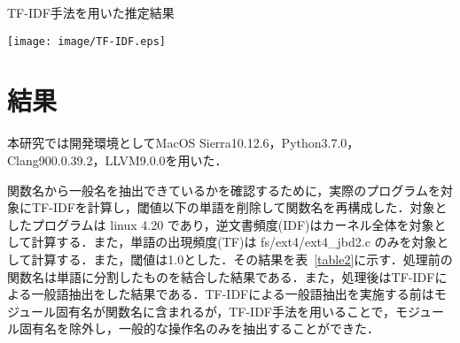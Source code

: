 \documentclass[submit,techrep,noauthor]{ipsj}
\begin{document}







\begin{table}[t]
 \centering
 \caption{TF-IDF手法を用いた推定結果}
 \texttt{[image: image/TF-IDF.eps]} 
 \label{table2} 
\end{table}


\section{結果}
本研究では開発環境としてMacOS Sierra10.12.6，Python3.7.0，Clang900.0.39.2，LLVM9.0.0を用いた．

関数名から一般名を抽出できているかを確認するために，実際のプログラムを対象にTF-IDFを計算し，閾値以下の単語を削除して関数名を再構成した．対象としたプログラムは linux 4.20 であり，逆文書頻度(IDF)はカーネル全体を対象として計算する．また，単語の出現頻度(TF)は fs/ext4/ext4\_jbd2.c のみを対象として計算する．また，閾値は1.0とした．その結果を表~\ref{table2}に示す．処理前の関数名は単語に分割したものを結合した結果である．また，処理後はTF-IDFによる一般語抽出をした結果である．TF-IDFによる一般語抽出を実施する前はモジュール固有名が関数名に含まれるが，TF-IDF手法を用いることで，モジュール固有名を除外し，一般的な操作名のみを抽出することができた．
\end{document}

